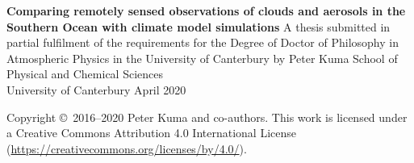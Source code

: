 \thispagestyle{empty}
\begin{center}
\null
\vfill
\LARGE
\textbf{Comparing remotely sensed observations of clouds and
aerosols in the Southern Ocean with climate model
simulations}
\vfill
\large
A thesis submitted in partial fulfilment of the requirements for the Degree
of Doctor of Philosophy in Atmospheric Physics
in the University of Canterbury
by Peter Kuma
\vfill
School of Physical and Chemical Sciences\\
University of Canterbury
\vfill
April 2020
\vfill
\end{center}
\clearpage
\thispagestyle{empty}
\null
\vfill
\noindent
Copyright \copyright\ 2016--2020 Peter Kuma and co-authors. This work is licensed under a Creative Commons Attribution 4.0 International License (\url{https://creativecommons.org/licenses/by/4.0/}).
